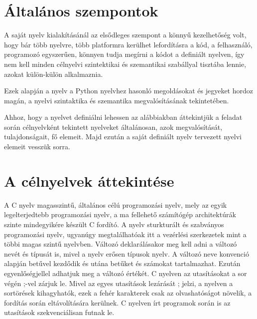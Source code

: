 
\section{Általános szempontok}


A saját nyelv kialakításánál az elsődleges szempont a könnyű kezelhetőség volt, hogy bár több nyelvre, több platformra kerülhet lefordításra a kód, a felhasználó, programozó egyszerűen, könnyen tudja megírni a kódot a definiált nyelven, így nem kell minden célnyelvi szintektikai és szemantikai szabállyal tisztába lennie, azokat külön-külön alkalmaznia.

Ezek alapján a nyelv a Python nyelvhez hasonló megoldásokat és jegyeket hordoz magán, a nyelvi szintaktika és szemantika megvalósításának tekintetében.

Ahhoz, hogy a nyelvet definiálni lehessen az alábbiakban áttekintjük a feladat során célnyelvként tekintett nyelveket általánosan, azok megvalósítását, tulajdonságait, fő elemeit. Majd ezután a saját definiált nyelv tervezett nyelvi elemeit vesszük sorra.

\section{A célnyelvek áttekintése}



A C nyelv magasszintű, általános célú programozási nyelv, mely az egyik legelterjedtebb programozási nyelv, a ma fellehető számítógép architektúrák szinte mindegyikére készült C fordító. A nyelv sturkturált és szabványos programozási nyelv, ugyanúgy megtalálhatóak itt a vezérlési szerkezetek mint a többi magas szintű nyelvben. Változó deklarálásakor meg kell adni a változó nevét és típusát is, mivel a nyelv erősen típusok nyelv. A változó neve konvenció alapján betűvel kezdődik és utána betűket és számokat tartalmazhat. Ezután egyenlőségjellel adhatjuk meg a változó értékét. C nyelven az utasításokat a sor végén ;-vel zárjuk le. Mivel az egyes utasítások lezárását ; jelzi, a nyelven a sortörések kihagyhatók, ezek a fehér karakterek csak az olvashatóságot növelik, a fordítás során eltávolítására kerülnek. C nyelven írt programok során is az utasítások szekvenciálisan futnak le.

